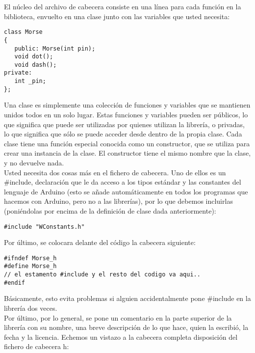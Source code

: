 El núcleo del archivo de cabecera consiste en una línea para cada función en la biblioteca, envuelto en una clase junto con las variables que usted necesita:
\begin{lstlisting}
class Morse
{
   public: Morse(int pin);
   void dot();
   void dash();
private:
   int _pin;
};
\end{lstlisting}
Una clase es simplemente una colección de funciones y variables que se mantienen unidos todos en un solo lugar. Estas funciones y variables pueden ser públicos, lo que significa que puede ser utilizadas por quienes utilizan la librería, o privadas, lo que significa que sólo se puede acceder desde dentro de la propia clase. Cada clase tiene una función especial conocida como un constructor, que se utiliza para crear una instancia de la clase. El constructor tiene el mismo nombre que la clase, y no devuelve nada.\\
Usted necesita dos cosas más en el fichero de cabecera. Uno de ellos es un \#include, declaración que le da acceso a los tipos estándar y las constantes del lenguaje de Arduino (esto se añade automáticamente en todos los programas que hacemos con Arduino, pero no a las librerías), por lo que debemos incluirlas (poniéndolas por encima de la definición de clase dada anteriormente):
\begin{lstlisting}
#include "WConstants.h"
\end{lstlisting}
Por último, se colocara delante del código la cabecera siguiente:
\begin{lstlisting}
#ifndef Morse_h
#define Morse_h
// el estamento #include y el resto del codigo va aqui..
#endif
\end{lstlisting}
Básicamente, esto evita problemas si alguien accidentalmente pone \#include en la librería dos veces.\\
Por último, por lo general, se pone un comentario en la parte superior de la librería con su nombre, una breve descripción de lo que hace, quien la escribió, la fecha y la licencia.
Echemos un vistazo a la cabecera completa disposición del fichero de cabecera h:\\

